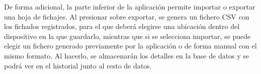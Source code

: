 De forma adicional, la parte inferior de la aplicación permite importar o exportar una hoja de fichajes. Al presionar sobre exportar, se genera un fichero CSV con los fichados registrados, para el que deberá elegirse una ubicación dentro del dispositivo en la que guardarlo, mientras que si se selecciona importar, se puede elegir un fichero generado previamente por la aplicación o de forma manual con el mismo formato. Al hacerlo, se almacenarán los detalles en la base de datos y se podrá ver en el historial junto al resto de datos.